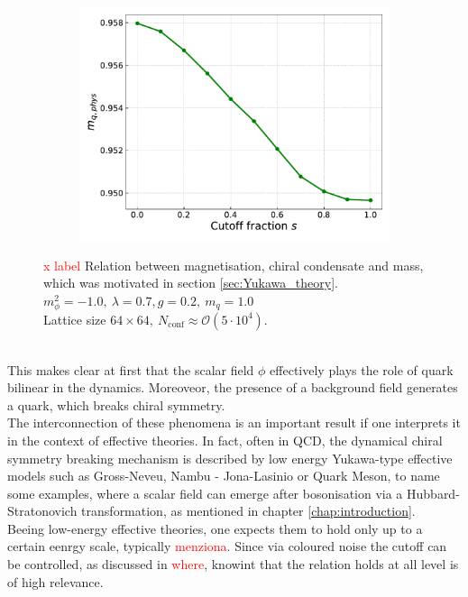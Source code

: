 \begin{figure}[h]
\begin{subfigure}[b]{0.48\textwidth}
        \includegraphics[width=1.0\textwidth]{figures/slide_broken/mass.pdf}
    \end{subfigure}
    \caption[Relation between magnetisation, condensate and mass]{\textcolor{red}{x label} Relation between magnetisation, chiral condensate and mass, which was motivated in section \ref{sec:Yukawa_theory}. \\ $m_\phi^2=-1.0, \ \lambda=0.7, g=0.2, \ m_q = 1.0$ \\ Lattice size $64 \times 64, \ N_\text{conf} \approx \mathcal{O}(5 \cdot 10^4)$.}
    \label{fig:interpolation_relation_phi_cond_mass}
\end{figure} \\
This makes clear at first that the scalar field $\phi$ effectively plays the role of quark bilinear in the dynamics. Moreoveor, the presence of a background field generates a quark, which breaks chiral symmetry. \\
The interconnection of these phenomena is an important result if one interprets it in the context of effective theories. In fact, often in QCD, the dynamical chiral symmetry breaking mechanism is described by low energy Yukawa-type effective models such as Gross-Neveu, Nambu - Jona-Lasinio or Quark Meson, to name some examples, where a scalar field can emerge after bosonisation via a Hubbard-Stratonovich transformation, as mentioned in chapter \ref{chap:introduction}. \\
Beeing low-energy effective theories, one expects them to hold only up to a certain eenrgy scale, typically \textcolor{red}{menziona}. Since via coloured noise the cutoff can be controlled, as discussed in \textcolor{red}{where}, knowint that the relation holds at all level is of high relevance. \\
